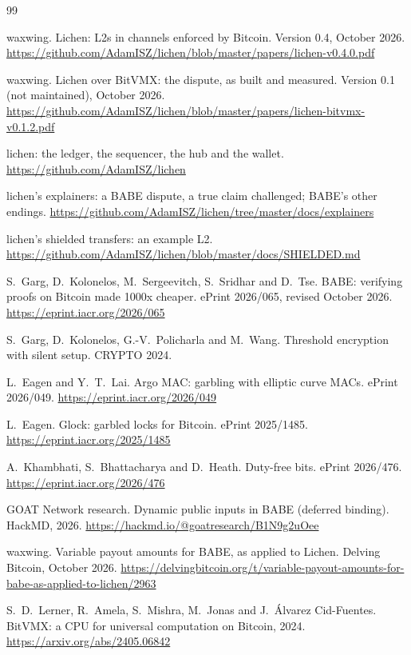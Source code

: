 \documentclass[11pt]{article}
\begin{document}
\begin{thebibliography}{99}

 waxwing. Lichen: L2s in channels enforced by Bitcoin. Version 0.4, October 2026. \url{https://github.com/AdamISZ/lichen/blob/master/papers/lichen-v0.4.0.pdf}

 waxwing. Lichen over BitVMX: the dispute, as built and measured. Version 0.1 (not maintained), October 2026. \url{https://github.com/AdamISZ/lichen/blob/master/papers/lichen-bitvmx-v0.1.2.pdf}

 lichen: the ledger, the sequencer, the hub and the wallet. \url{https://github.com/AdamISZ/lichen}

 lichen's explainers: a BABE dispute, a true claim challenged; BABE's other endings. \url{https://github.com/AdamISZ/lichen/tree/master/docs/explainers}

 lichen's shielded transfers: an example L2. \url{https://github.com/AdamISZ/lichen/blob/master/docs/SHIELDED.md}

 S.~Garg, D.~Kolonelos, M.~Sergeevitch, S.~Sridhar and D.~Tse. BABE: verifying proofs on Bitcoin made 1000x cheaper. ePrint 2026/065, revised October 2026. \url{https://eprint.iacr.org/2026/065}

 S.~Garg, D.~Kolonelos, G.-V.~Policharla and M.~Wang. Threshold encryption with silent setup. CRYPTO 2024.

 L.~Eagen and Y.~T.~Lai. Argo MAC: garbling with elliptic curve MACs. ePrint 2026/049. \url{https://eprint.iacr.org/2026/049}

 L.~Eagen. Glock: garbled locks for Bitcoin. ePrint 2025/1485. \url{https://eprint.iacr.org/2025/1485}

 A.~Khambhati, S.~Bhattacharya and D.~Heath. Duty-free bits. ePrint 2026/476. \url{https://eprint.iacr.org/2026/476}

 GOAT Network research. Dynamic public inputs in BABE (deferred binding). HackMD, 2026. \url{https://hackmd.io/@goatresearch/B1N9g2uOee}

 waxwing. Variable payout amounts for BABE, as applied to Lichen. Delving Bitcoin, October 2026. \url{https://delvingbitcoin.org/t/variable-payout-amounts-for-babe-as-applied-to-lichen/2963}

 S.~D.~Lerner, R.~Amela, S.~Mishra, M.~Jonas and J.~\'Alvarez Cid-Fuentes. BitVMX: a CPU for universal computation on Bitcoin, 2024. \url{https://arxiv.org/abs/2405.06842}


\end{thebibliography}
\end{document}
